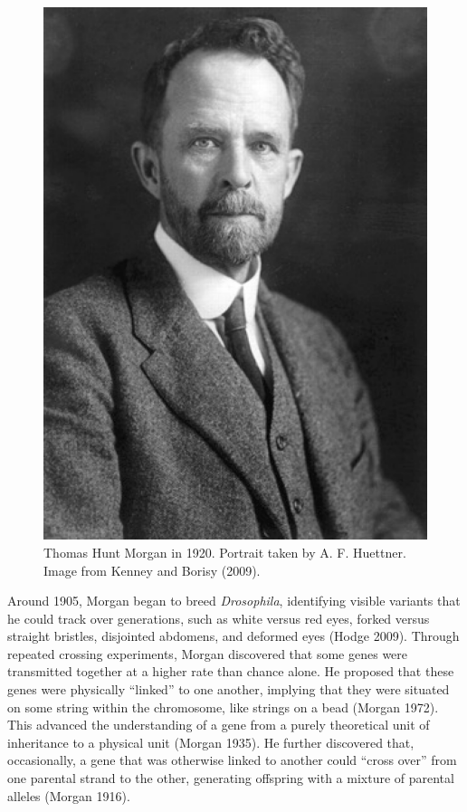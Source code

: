 \documentclass[
]{book}
\begin{document}
\begin{figure}

{\centering \includegraphics[width=0.8\linewidth]{figs/introduction/Thomas_Morgan} 

}

\caption{Thomas Hunt Morgan in 1920. Portrait taken by A. F. Huettner. Image from Kenney and Borisy (2009).}\label{fig:morgan}
\end{figure}

Around 1905, Morgan began to breed \emph{Drosophila}, identifying visible variants that he could track over generations, such as white versus red eyes, forked versus straight bristles, disjointed abdomens, and deformed eyes (Hodge 2009). Through repeated crossing experiments, Morgan discovered that some genes were transmitted together at a higher rate than chance alone. He proposed that these genes were physically ``linked'' to one another, implying that they were situated on some string within the chromosome, like strings on a bead (Morgan 1972). This advanced the understanding of a gene from a purely theoretical unit of inheritance to a physical unit (Morgan 1935). He further discovered that, occasionally, a gene that was otherwise linked to another could ``cross over'' from one parental strand to the other, generating offspring with a mixture of parental alleles (Morgan 1916).
\end{document}
